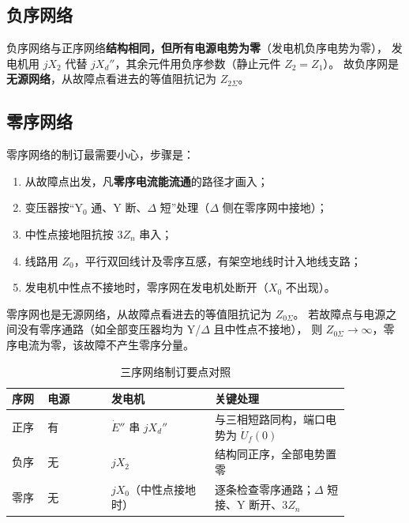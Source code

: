 \subsection{负序网络}

负序网络与正序网络\textbf{结构相同，但所有电源电势为零}（发电机负序电势为零），
发电机用 $jX_2$ 代替 $jX_d''$，其余元件用负序参数（静止元件 $Z_2=Z_1$）。
故负序网是\textbf{无源网络}，从故障点看进去的等值阻抗记为 $Z_{2\Sigma}$。

\subsection{零序网络}

零序网络的制订最需要小心，步骤是：
\begin{enumerate}
  \item 从故障点出发，凡\textbf{零序电流能流通}的路径才画入；
  \item 变压器按“Y$_0$ 通、Y 断、$\Delta$ 短”处理（$\Delta$ 侧在零序网中接地）；
  \item 中性点接地阻抗按 $3Z_n$ 串入；
  \item 线路用 $Z_0$，平行双回线计及零序互感，有架空地线时计入地线支路；
  \item 发电机中性点不接地时，零序网在发电机处断开（$X_0$ 不出现）。
\end{enumerate}
零序网也是无源网络，从故障点看进去的等值阻抗记为 $Z_{0\Sigma}$。
若故障点与电源之间没有零序通路（如全部变压器均为 Y/$\Delta$ 且中性点不接地），
则 $Z_{0\Sigma}\to\infty$，零序电流为零，该故障不产生零序分量。

\begin{table}[htbp]
  \centering
  \caption{三序网络制订要点对照}
  \small
  \begin{tabular}{@{}p{0.09\linewidth}p{0.16\linewidth}p{0.26\linewidth}p{0.34\linewidth}@{}}
    \toprule
    序网 & 电源 & 发电机 & 关键处理 \\
    \midrule
    正序 & 有 & $\dot E''$ 串 $jX_d''$ & 与三相短路同构，端口电势为 $\dot U_f(0)$ \\
    负序 & 无 & $jX_2$ & 结构同正序，全部电势置零 \\
    零序 & 无 & $jX_0$（中性点接地时） & 逐条检查零序通路；$\Delta$ 短接、Y 断开、$3Z_n$ \\
    \bottomrule
  \end{tabular}
\end{table}

